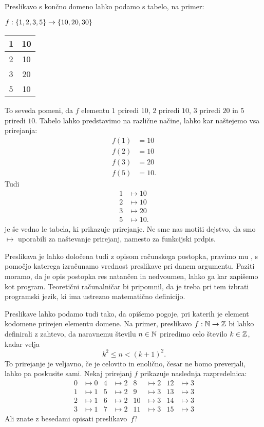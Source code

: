 Preslikavo s končno domeno lahko podamo s tabelo, na primer:
%
\begin{center}
  $f : \set{1, 2, 3, 5} \to \set{10, 20, 30}$

  \medskip

  \begin{tabular}{|c|c|} \hline
    1 & 10 \\ \hline
    2 & 10 \\ \hline
    3 & 20 \\ \hline
    5 & 10 \\ \hline
  \end{tabular}
\end{center}
%
To seveda pomeni, da $f$ elementu $1$ priredi $10$, $2$ priredi $10$, $3$ priredi $20$ in $5$
priredi $10$. Tabelo lahko predstavimo na različne načine, lahko kar naštejemo vsa prirejanja:
%
\begin{align*}
  f(1) &= 10 \\
  f(2) &= 10 \\
  f(3) &= 20 \\
  f(5) &= 10.
\end{align*}
%
Tudi
%
\begin{align*}
  1 &\mapsto 10 \\
  2 &\mapsto 10 \\
  3 &\mapsto 20 \\
  5 &\mapsto 10.
\end{align*}
%
je še vedno le tabela, ki prikazuje prirejanje. Ne sme nas motiti dejstvo, da smo
$\mapsto$ uporabili za naštevanje prirejanj, namesto za funkcijski prdpis.

Preslikava je lahko določena tudi z opisom računskega postopka, pravimo mu ,
s pomočjo katerega izračunamo vrednost preslikave pri danem argumentu. Paziti moramo, da je
opis postopka res natančen in nedvoumen, lahko ga kar zapišemo kot program. Teoretični
računalničar bi pripomnil, da je treba pri tem izbrati programski jezik, ki ima ustrezno
matematično definicijo.

Preslikave lahko podamo tudi tako, da opišemo pogoje, pri katerih je element kodomene
prirejen elementu domene. Na primer, preslikavo $f : \mathbb{N} \to \mathbb{Z}$ bi lahko definirali z
zahtevo, da naravnemu številu $n \in \mathbb{N}$ priredimo celo število $k \in \mathbb{Z}$, kadar velja
%
\begin{equation*}
  k^2 \leq n < (k+1)^2.
\end{equation*}
%
To prirejanje je veljavno, če je celovito in enolično, česar ne bomo preverjali, lahko pa
poskusite sami. Nekaj prirejanj $f$ prikazuje naslednja razpredelnica:
%
\begin{align*}
0 &\mapsto 0   &   4 &\mapsto 2   &    8  &\mapsto 2   &   12 &\mapsto 3 \\
1 &\mapsto 1   &   5 &\mapsto 2   &    9  &\mapsto 3   &   13 &\mapsto 3 \\
2 &\mapsto 1   &   6 &\mapsto 2   &    10 &\mapsto 3   &   14 &\mapsto 3 \\
3 &\mapsto 1   &   7 &\mapsto 2   &    11 &\mapsto 3   &   15 &\mapsto 3
\end{align*}
%
Ali znate z besedami opisati preslikavo~$f$?

